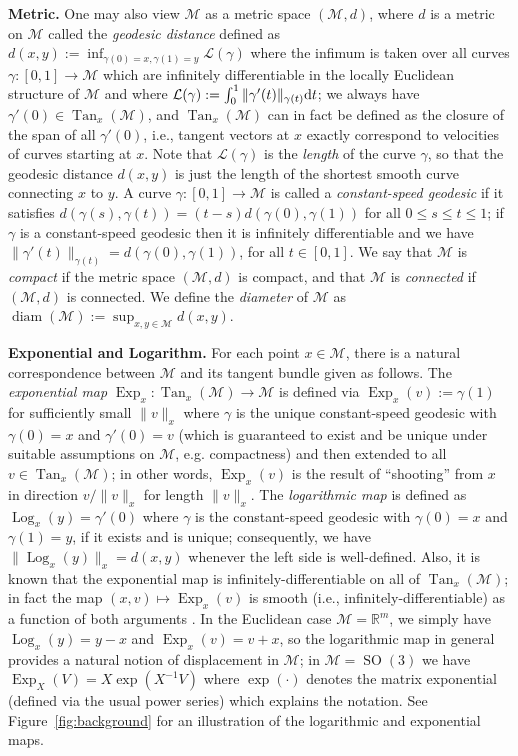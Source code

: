 \documentclass[preprint]{imsart}
\theoremstyle{plain}
\theoremstyle{definition}
\newcommand{\Rbb}{\mathbb{R}}
\newcommand{\Mcal}{\mathcal{M}}
\newcommand{\diff}{\textnormal{d}}
\DeclareMathOperator{\Tan}{Tan}
\DeclareMathOperator{\Log}{Log}
\DeclareMathOperator{\Exp}{Exp}
\DeclareMathOperator{\diam}{diam}
\DeclareMathOperator{\SO}{SO}
\begin{document}
\medskip

\noindent \textbf{Metric.}  One may also view $\Mcal$ as a metric space $(\Mcal,d)$, where $d$ is a metric on $\Mcal$ called the \textit{geodesic distance} defined as $d(x,y) := \inf_{\gamma(0)=x,\gamma(1)=y}\mathcal{L}(\gamma)$ where the infimum is taken over all curves $\gamma:[0,1]\to\Mcal$ which are infinitely differentiable in the locally Euclidean structure of $\Mcal$ and where $\mathcal{L}(\gamma):=\int_{0}^{1}\|\gamma'(t)\|_{\gamma(t)}\diff t$; we always have $\gamma'(0)\in\Tan_x(\Mcal)$, and $\Tan_x(\Mcal)$ can in fact be defined as the closure of the span of all $\gamma'(0)$, i.e., tangent vectors at $x$ exactly correspond to velocities of curves starting at $x$.
Note that $\mathcal{L}(\gamma)$ is the \textit{length} of the curve $\gamma$, so that the geodesic distance $d(x,y)$ is just the length of the shortest smooth curve connecting $x$ to $y$.
A curve $\gamma:[0,1]\to \Mcal$ is called a \textit{constant-speed geodesic} if it satisfies $d(\gamma(s),\gamma(t)) = (t-s)d(\gamma(0),\gamma(1))$ for all $0\le s\le t \le 1$; if $\gamma$ is a constant-speed geodesic then it is infinitely differentiable and we have $\|\gamma'(t)\|_{\gamma(t)} = d(\gamma(0),\gamma(1))$, for all $t \in [0,1]$.
We say that $\Mcal$ is \textit{compact} if the metric space $(\Mcal,d)$ is compact, and that $\Mcal$ is \textit{connected} if $(\Mcal,d)$ is connected.
We define the \textit{diameter} of $\Mcal$ as $\diam(\Mcal):=\sup_{x,y\in\Mcal}d(x,y)$.

\medskip

\noindent \textbf{Exponential and Logarithm.} 
For each point $x\in\Mcal$, there is a natural correspondence between $\Mcal$ and its tangent bundle given as follows.
The \textit{exponential map} $\Exp_x:\Tan_x(\Mcal)\to\Mcal$ is defined via $\Exp_x(v):=\gamma(1)$ for sufficiently small $\|v\|_x$ where $\gamma$ is the unique constant-speed geodesic with $\gamma(0)=x$ and $\gamma'(0)=v$ (which is guaranteed to exist and be unique under suitable assumptions on $\Mcal$, e.g. compactness) and then extended to all $v\in\Tan_x(\Mcal)$; in other words, $\Exp_x(v)$ is the result of ``shooting'' from $x$ in direction $v/\|v\|_x$ for length $\|v\|_x.$ The \textit{logarithmic map} is defined as $\Log_x(y) = \gamma'(0)$ where $\gamma$ is the constant-speed geodesic with $\gamma(0)=x$ and $\gamma(1) = y$,  if it exists and is unique; consequently, we have $\|\Log_x(y)\|_x= d(x,y)$ whenever the left side is well-defined. Also, it is known that the exponential map is infinitely-differentiable on all of $\Tan_x(\Mcal)$; in fact the map $(x,v)\mapsto \Exp_x(v)$ is smooth (i.e., infinitely-differentiable) as a function of both arguments \cite[Chapter~5.5.1]{Petersen}.
In the Euclidean case $\Mcal=\Rbb^m$, we simply have $\Log_x(y) = y-x$ and $\Exp_x(v) = v+x$, so the logarithmic map in general provides a natural notion of displacement in $\Mcal$; in $\Mcal=\SO(3)$ we have $\Exp_X(V) = X\exp(X^{-1}V)$ where $\exp(\cdot)$ denotes the matrix exponential (defined via the usual power series) which explains the notation.
See Figure~\ref{fig:background} for an illustration of the logarithmic and exponential maps.
\end{document}

